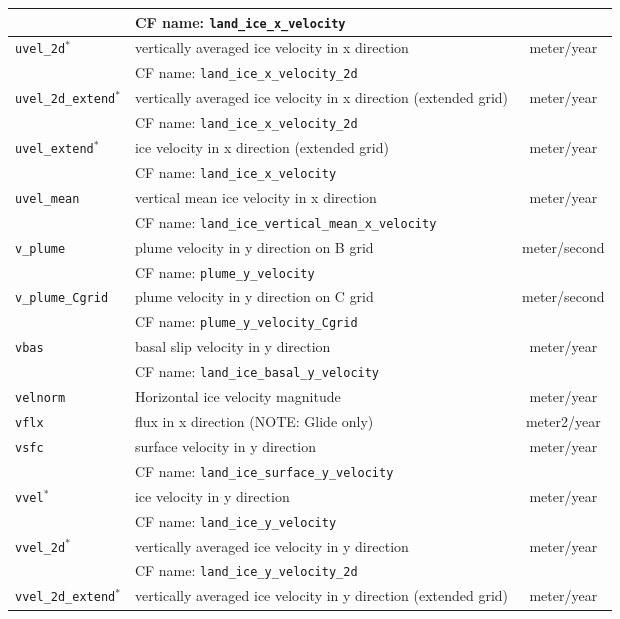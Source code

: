\begin{center}
\begin{supertabular}{|l|p{8cm}|c|}
&CF name: \texttt{land\_ice\_x\_velocity}&\\
\hline
\texttt{uvel\_2d}$^\ast$ & vertically averaged ice velocity in x direction & meter/year\\
&CF name: \texttt{land\_ice\_x\_velocity\_2d}&\\
\hline
\texttt{uvel\_2d\_extend}$^\ast$ & vertically averaged ice velocity in x direction (extended grid) & meter/year\\
&CF name: \texttt{land\_ice\_x\_velocity\_2d}&\\
\hline
\texttt{uvel\_extend}$^\ast$ & ice velocity in x direction (extended grid) & meter/year\\
&CF name: \texttt{land\_ice\_x\_velocity}&\\
\hline
\texttt{uvel\_mean} & vertical mean ice velocity in x direction & meter/year\\
&CF name: \texttt{land\_ice\_vertical\_mean\_x\_velocity}&\\
\hline
\texttt{v\_plume} & plume velocity in y direction on B grid & meter/second\\
&CF name: \texttt{plume\_y\_velocity}&\\
\hline
\texttt{v\_plume\_Cgrid} & plume velocity in y direction on C grid & meter/second\\
&CF name: \texttt{plume\_y\_velocity\_Cgrid}&\\
\hline
\texttt{vbas} & basal slip velocity in y direction & meter/year\\
&CF name: \texttt{land\_ice\_basal\_y\_velocity}&\\
\hline
\texttt{velnorm} & Horizontal ice velocity magnitude & meter/year\\
\hline
\texttt{vflx} & flux in x direction (NOTE: Glide only) & meter2/year\\
\hline
\texttt{vsfc} & surface velocity in y direction & meter/year\\
&CF name: \texttt{land\_ice\_surface\_y\_velocity}&\\
\hline
\texttt{vvel}$^\ast$ & ice velocity in y direction & meter/year\\
&CF name: \texttt{land\_ice\_y\_velocity}&\\
\hline
\texttt{vvel\_2d}$^\ast$ & vertically averaged ice velocity in y direction & meter/year\\
&CF name: \texttt{land\_ice\_y\_velocity\_2d}&\\
\hline
\texttt{vvel\_2d\_extend}$^\ast$ & vertically averaged ice velocity in y direction (extended grid) & meter/year\\

\end{supertabular}
\end{center}
